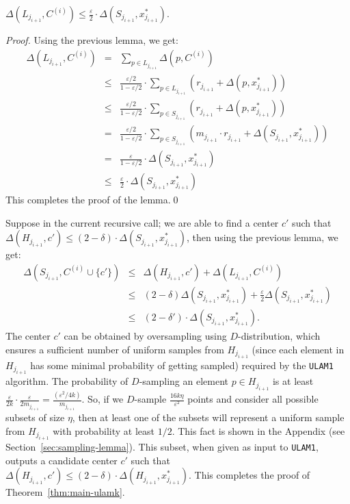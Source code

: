 \documentclass[11pt]{llncs}
\newcommand{\veps}{\varepsilon}
\begin{document}
\begin{lemma}
$\Delta(L_{j_{i+1}}, C^{(i)}) \leq \frac{\veps}{2} \cdot \Delta(S_{j_{i+1}}, x^*_{j_{i+1}})$.
\end{lemma}
\begin{proof}
Using the previous lemma, we get: 
\begin{eqnarray*}
\Delta(L_{j_{i+1}}, C^{(i)}) &=& \sum_{p \in L_{j_{i+1}}} \Delta(p, C^{(i)})\\
&\leq&  \frac{\veps/2}{1-\veps/2} \cdot \sum_{p \in L_{j_{i+1}}}  (r_{j_{i+1}} + \Delta(p, x^*_{j_{i+1}}))\\
&\leq&  \frac{\veps/2}{1-\veps/2} \cdot \sum_{p \in S_{j_{i+1}}}  (r_{j_{i+1}} + \Delta(p, x^*_{j_{i+1}}))\\
&=&  \frac{\veps/2}{1-\veps/2} \cdot \sum_{p \in S_{j_{i+1}}} (m_{j_{i+1}} \cdot r_{j_{i+1}} + \Delta(S_{j_{i+1}}, x^*_{j_{i+1}})) \\
&=& \frac{\veps}{1 - \veps/2} \cdot \Delta(S_{j_{i+1}}, x^*_{j_{i+1}})\\
&\leq& \frac{\veps}{2} \cdot \Delta(S_{j_{i+1}}, x^*_{j_{i+1}})
\end{eqnarray*}
This completes the proof of the lemma.\qed
\end{proof}
Suppose in the current recursive call; we are able to find a center $c'$ such that $\Delta(H_{j_{i+1}}, c') \leq (2-\delta) \cdot \Delta(S_{j_{i+1}}, x^*_{j_{i+1}})$, then using the previous lemma, we get: 
\begin{eqnarray*}
\Delta(S_{j_{i+1}}, C^{(i)}\cup \{c'\}) &\leq& \Delta(H_{j_{i+1}}, c') + \Delta(L_{j_{i+1}}, C^{(i)}) \\
&\leq& (2-\delta) \Delta(S_{j_{i+1}}, x^*_{j_{i+1}}) + \frac{\veps}{2} \Delta(S_{j_{i+1}}, x^*_{j_{i+1}}) \\
&\leq& (2-\delta') \cdot \Delta(S_{j_{i+1}}, x^*_{j_{i+1}}).
\end{eqnarray*}
The center $c'$ can be obtained by oversampling using $D$-distribution, which ensures a sufficient number of uniform samples from $H_{j_{i+1}}$ (since each element in $H_{j_{i+1}}$ has some minimal probability of getting sampled) required by the {\tt ULAM1} algorithm.
The probability of $D$-sampling an element $p \in H_{j_{i+1}}$ is at least $\frac{\veps}{2k} \cdot \frac{\veps}{2 m_{j_{i+1}}} = \frac{(\veps^2/4k)}{m_{j_{i+1}}}$. 
So, if we $D$-sample $\frac{16k \eta}{\veps^2}$ points and consider all possible subsets of size $\eta$, then at least one of the subsets will represent a uniform sample from $H_{j_{i+1}}$ with probability at least $1/2$. This fact is shown in the Appendix (see Section~\ref{sec:sampling-lemma}).
This subset, when given as input to {\tt ULAM1}, outputs a candidate center $c'$ such that $\Delta(H_{j_{i+1}}, c') \leq (2-\delta) \cdot \Delta(H_{j_{i+1}}, x^*_{j_{i+1}})$. This completes the proof of Theorem~\ref{thm:main-ulamk}.
\end{document}
